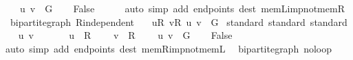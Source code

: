 \begin{isabellebody}
\ \ \ \ {\isachardoublequoteopen}{\isacharbraceleft}{\kern0pt}u{\isacharcomma}{\kern0pt}\ v{\isacharbraceright}{\kern0pt}\ {\isasymin}\ G{\isachardoublequoteclose}\isanewline
\ \ \isamarkupfalse%
\ False\isanewline
\ \ \ \ \isamarkupfalse%
\ {\isacharparenleft}{\kern0pt}auto\ simp\ add{\isacharcolon}{\kern0pt}\ endpoints\ dest{\isacharcolon}{\kern0pt}\ mem{\isacharunderscore}{\kern0pt}L{\isacharunderscore}{\kern0pt}imp{\isacharunderscore}{\kern0pt}not{\isacharunderscore}{\kern0pt}mem{\isacharunderscore}{\kern0pt}R{\isacharparenright}{\kern0pt}\isanewline
{}\isamarkupfalse%
%
\endisatagproof
{\isafoldproof}%
%
\isadelimproof
\isanewline
%
\endisadelimproof
\isanewline
{}\isamarkupfalse%
\ {\isacharparenleft}{\kern0pt}\ bipartite{\isacharunderscore}{\kern0pt}graph{\isacharparenright}{\kern0pt}\ R{\isacharunderscore}{\kern0pt}independent{\isacharcolon}{\kern0pt}\isanewline
\ \ \ {\isachardoublequoteopen}{\isasymforall}u{\isasymin}R{\isachardot}{\kern0pt}\ {\isasymforall}v{\isasymin}R{\isachardot}{\kern0pt}\ {\isacharbraceleft}{\kern0pt}u{\isacharcomma}{\kern0pt}\ v{\isacharbraceright}{\kern0pt}\ {\isasymnotin}\ G{\isachardoublequoteclose}\isanewline
%
\isadelimproof
%
\endisadelimproof
%
\isatagproof
{}\isamarkupfalse%
\ {\isacharparenleft}{\kern0pt}standard{\isacharcomma}{\kern0pt}\ standard{\isacharcomma}{\kern0pt}\ standard{\isacharparenright}{\kern0pt}\isanewline
\ \ \isamarkupfalse%
\ u\ v\isanewline
\ \ \isamarkupfalse%
\isanewline
\ \ \ \ {\isachardoublequoteopen}u\ {\isasymin}\ R{\isachardoublequoteclose}\isanewline
\ \ \ \ {\isachardoublequoteopen}v\ {\isasymin}\ R{\isachardoublequoteclose}\isanewline
\ \ \ \ {\isachardoublequoteopen}{\isacharbraceleft}{\kern0pt}u{\isacharcomma}{\kern0pt}\ v{\isacharbraceright}{\kern0pt}\ {\isasymin}\ G{\isachardoublequoteclose}\isanewline
\ \ \isamarkupfalse%
\ False\isanewline
\ \ \ \ \isamarkupfalse%
\ {\isacharparenleft}{\kern0pt}auto\ simp\ add{\isacharcolon}{\kern0pt}\ endpoints\ dest{\isacharcolon}{\kern0pt}\ mem{\isacharunderscore}{\kern0pt}R{\isacharunderscore}{\kern0pt}imp{\isacharunderscore}{\kern0pt}not{\isacharunderscore}{\kern0pt}mem{\isacharunderscore}{\kern0pt}L{\isacharparenright}{\kern0pt}\isanewline
{}\isamarkupfalse%
%
\endisatagproof
{\isafoldproof}%
%
\isadelimproof
\isanewline
%
\endisadelimproof
\isanewline
{}\isamarkupfalse%
\ {\isacharparenleft}{\kern0pt}\ bipartite{\isacharunderscore}{\kern0pt}graph{\isacharparenright}{\kern0pt}\ no{\isacharunderscore}{\kern0pt}loop{\isacharcolon}{\kern0pt}\isanewline

\end{isabellebody}
